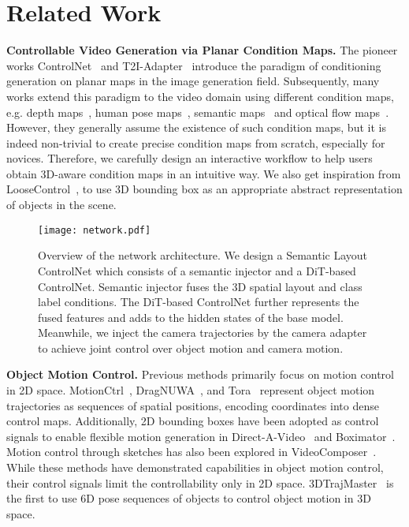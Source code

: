 \section{Related Work}
\label{sec:formatting}

\noindent\textbf{Controllable Video Generation via Planar Condition Maps.} The pioneer works ControlNet~\cite{controlnet} and T2I-Adapter~\cite{mou2024t2i} introduce the paradigm of conditioning generation on planar maps in the image generation field. Subsequently, many works extend this paradigm to the video domain using different condition maps, e.g. depth maps~\cite{chen2023control}, human pose maps~\cite{hu2024animate}, semantic maps~\cite{wang2024easycontrol} and optical flow maps~\cite{motioni2v,koroglu2024onlyflow,bian2025gs}. However, they generally assume the existence of such condition maps, but it is indeed non-trivial to create precise condition maps from scratch, especially for novices. Therefore, we carefully design an interactive workflow to help users obtain 3D-aware condition maps in an intuitive way. We also get inspiration from LooseControl~\cite{bhat2024loosecontrol}, to use 3D bounding box as an appropriate abstract representation of objects in the scene.



\begin{figure*}[!t]
  \centering
  \texttt{[image: network.pdf]}
  \vspace{-15pt}
  \caption{Overview of the network architecture. We design a Semantic Layout ControlNet which consists of a semantic injector and a DiT-based ControlNet. Semantic injector fuses the 3D spatial layout and class label conditions. The DiT-based ControlNet further represents the fused features and adds to the hidden states of the base model. Meanwhile, we inject the camera trajectories by the camera adapter to achieve joint control over object motion and camera motion.}
  \label{fig:network}
  \vspace{-4pt}  
\end{figure*}


\noindent\textbf{Object Motion Control.} Previous methods primarily focus on motion control in 2D space. MotionCtrl~\cite{MotionCtrl}, DragNUWA~\cite{dragnuwa}, and Tora~\cite{Tora2024} represent object motion trajectories as sequences of spatial positions, encoding coordinates into dense control maps. Additionally, 2D bounding boxes have been adopted as control signals to enable flexible motion generation in Direct-A-Video~\cite{yang2024direct} and Boximator~\cite{boximator}. Motion control through sketches has also been explored in VideoComposer~\cite{VideoComposer}. 
While these methods have demonstrated capabilities in object motion control, their control signals limit the controllability only in 2D space. 3DTrajMaster~\cite{fu20243dtrajmaster} is the first to use 6D pose sequences of objects to control object motion in 3D space.




